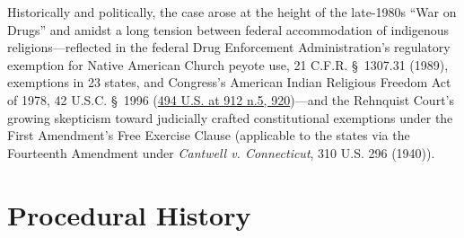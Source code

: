 \documentclass[12pt]{article}
\begin{document}
Historically and politically, the case arose at the height of the late-1980s ``War on Drugs'' and amidst a long tension between federal accommodation of indigenous religions---reflected in the federal Drug Enforcement Administration's regulatory exemption for Native American Church peyote use, 21 C.F.R. \S~1307.31 (1989), exemptions in 23 states, and Congress's American Indian Religious Freedom Act of 1978, 42 U.S.C. \S~1996 (\href{https://supreme.justia.com/cases/federal/us/494/872/}{494 U.S. at 912 n.5, 920})---and the Rehnquist Court's growing skepticism toward judicially crafted constitutional exemptions under the First Amendment's Free Exercise Clause (applicable to the states via the Fourteenth Amendment under \textit{Cantwell v. Connecticut}, 310 U.S. 296 (1940)).

\section{Procedural History}
\end{document}
